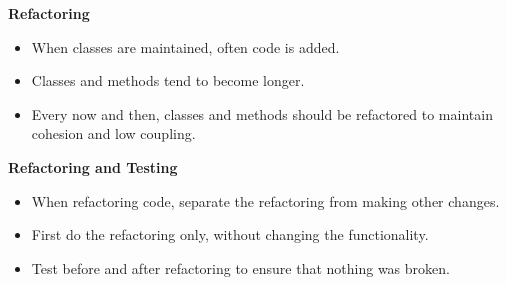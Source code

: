 \documentclass{beamer}
\begin{document}
\begin{frame}
\begin{center}
\textbf{Refactoring}
\end{center}
\begin{itemize}
\item When classes are maintained, often code is added. 
\item Classes and methods tend to become longer.
\item Every now and then, classes and methods should be refactored to maintain cohesion and low coupling.
\end{itemize}
\end{frame}

\begin{frame}
\begin{center}
\textbf{Refactoring and Testing}
\end{center}
\begin{itemize}
\item When refactoring code, separate the refactoring from making other changes.
\item First do the refactoring only, without changing the functionality.
\item Test before and after refactoring to ensure that nothing was broken.
\end{itemize}
\end{frame}
\end{document}
